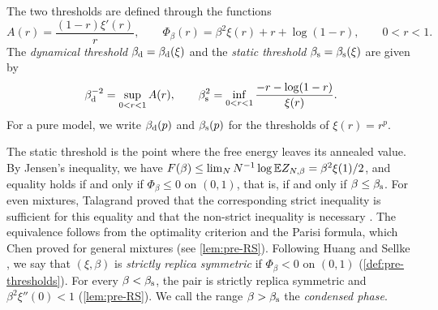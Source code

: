 The two thresholds are defined through the functions
\begin{equation*}
A(r)=\frac{(1-r)\xi'(r)}r,\qquad\Phi_\beta(r)=\beta^2\xi(r)+r+\log(1-r),\qquad0<r<1.
\end{equation*}
The \emph{dynamical threshold} $\beta_{\mathrm d}=\beta_{\mathrm d}(\xi)$ and the \emph{static threshold} $\beta_{\mathrm s}=\beta_{\mathrm s}(\xi)$ are given by
\begin{equation}\label{eq:intro-thresholds}
\beta_{\mathrm d}^{-2}=\sup_{0<r<1}A(r),\qquad\beta_{\mathrm s}^2=\inf_{0<r<1}\frac{-r-\log(1-r)}{\xi(r)}.
\end{equation}
For a pure model, we write $\beta_{\mathrm d}(p)$ and $\beta_{\mathrm s}(p)$ for the thresholds of $\xi(r)=r^p$.

The static threshold is the point where the free energy leaves its annealed value. By Jensen's inequality, we have $F(\beta)\le\lim_NN^{-1}\log\mathbb E Z_{N,\beta}=\beta^2\xi(1)/2$, and equality holds if and only if $\Phi_\beta\le0$ on $(0,1)$, that is, if and only if $\beta\le\beta_{\mathrm s}$. For even mixtures, Talagrand proved that the corresponding strict inequality is sufficient for this equality and that the non-strict inequality is necessary \cite[Proposition~2.3]{Talagrand2006}. The equivalence follows from the optimality criterion \cite[Proposition~2.1]{Talagrand2006} and the Parisi formula, which Chen proved for general mixtures \cite{Chen2013} (see \cref{lem:pre-RS}). Following Huang and Sellke \cite[Definition~3]{HuangSellke2024}, we say that $(\xi,\beta)$ is \emph{strictly replica symmetric} if $\Phi_\beta<0$ on $(0,1)$ (\cref{def:pre-thresholds}). For every $\beta<\beta_{\mathrm s}$, the pair is strictly replica symmetric and $\beta^2\xi''(0)<1$ (\cref{lem:pre-RS}). We call the range $\beta>\beta_{\mathrm s}$ the \emph{condensed phase}.

